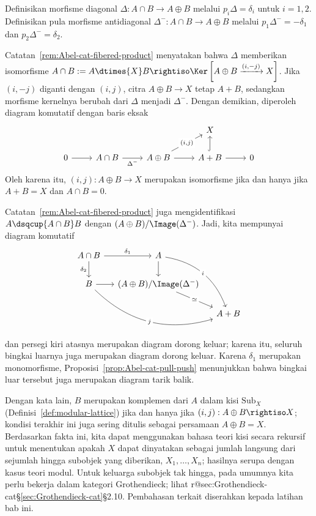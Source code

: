 \begin{bukti}
	Definisikan morfisme diagonal $\Delta:A\cap B\to A\oplus B$ melalui
	$p_i\Delta=\delta_i$ untuk $i=1,2$. Definisikan pula morfisme
	antidiagonal $\Delta^-:A\cap B\to A\oplus B$ melalui
	$p_1\Delta^-=-\delta_1$ dan $p_2\Delta^-=\delta_2$.

	Catatan~\ref{rem:Abel-cat-fibered-product} menyatakan bahwa $\Delta$
	memberikan isomorfisme
	$A\cap B:=A\dtimes{X}B\rightiso
	\Ker\left[A\oplus B\xrightarrow{(i,-j)}X\right]$. Jika $(i,-j)$ diganti
	dengan $(i,j)$, citra $A\oplus B\to X$ tetap $A+B$, sedangkan morfisme
	kernelnya berubah dari $\Delta$ menjadi $\Delta^-$. Dengan demikian,
	diperoleh diagram komutatif
	dengan baris eksak
	\[\begin{tikzcd}
		& & & X & \\
		0 \arrow[r] & A \cap B \arrow[r, "{\Delta^-}"'] & A \oplus B \arrow[ru, "{(i, j)}" description] \arrow[r] & A+B \arrow[r] \arrow[hookrightarrow, u] & 0
	\end{tikzcd}\]
	Oleh karena itu, $(i,j):A\oplus B\to X$ merupakan isomorfisme jika dan
	hanya jika $A+B=X$ dan $A\cap B=0$.

	Catatan~\ref{rem:Abel-cat-fibered-product} juga mengidentifikasi
	$A\dsqcup{A\cap B}B$ dengan
	$(A\oplus B)/\Image(\Delta^-)$. Jadi, kita mempunyai diagram komutatif
	\[\begin{tikzcd}[column sep=small]
		A \cap B \arrow[r, "\delta_1"] \arrow[d, "\delta_2"'] & A \arrow[d] \arrow[rdd, bend left, "i" description] & \\
		B \arrow[r] \arrow[rrd, bend right, "j" description] & (A \oplus B)/\Image(\Delta^-) \arrow[rd, "\simeq" description] & \\
		& & A + B
	\end{tikzcd}\]
	dan persegi kiri atasnya merupakan diagram dorong keluar; karena itu, seluruh
	bingkai luarnya juga merupakan diagram dorong keluar. Karena $\delta_1$ merupakan
	monomorfisme, Proposisi~\ref{prop:Abel-cat-pull-push} menunjukkan bahwa
	bingkai luar tersebut juga merupakan diagram tarik balik.
\end{bukti}

Dengan kata lain, $B$ merupakan komplemen dari $A$ dalam kisi
$\mathrm{Sub}_X$ (Definisi~\ref{def:modular-lattice}) jika dan hanya jika
$(i,j):A\oplus B\rightiso X$; kondisi terakhir ini juga sering ditulis
sebagai persamaan $A\oplus B=X$. Berdasarkan fakta ini, kita dapat menggunakan
bahasa teori kisi secara rekursif untuk menentukan apakah $X$ dapat
dinyatakan sebagai jumlah langsung dari sejumlah hingga subobjek yang
diberikan, $X_1,\ldots,X_n$; hasilnya serupa dengan kasus teori modul. Untuk
keluarga subobjek tak hingga, pada umumnya kita perlu bekerja dalam kategori
Grothendieck; lihat
\ifcsname r@sec:Grothendieck-cat\endcsname\S\ref{sec:Grothendieck-cat}\else\S2.10\fi.
Pembahasan terkait diserahkan kepada latihan bab ini.

